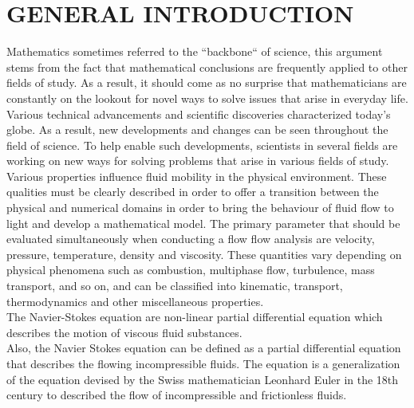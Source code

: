 \documentclass[11pt]{report}
\begin{document}
	\newpage
	\tableofcontents

	\newpage
	\chapter{GENERAL INTRODUCTION}
	Mathematics sometimes referred to the ``backbone`` of science, this argument stems from the fact that mathematical conclusions are frequently applied to other fields of study. As a result, it should come as no surprise that mathematicians are constantly on the lookout for novel ways to solve issues that arise in everyday life.\\
	
	Various technical advancements and scientific discoveries characterized today's globe. As a result, new developments and changes can be seen throughout the field of science. To help enable such developments, scientists in several fields are working on new ways for solving problems that arise in various fields of study.\\
	
	Various properties influence fluid mobility in the physical environment. These qualities must be clearly described in order to offer a transition between the physical and numerical domains in order to bring the behaviour of fluid flow to light and develop a mathematical model. The primary parameter that should be evaluated simultaneously when conducting a flow flow analysis are velocity, pressure, temperature, density and viscosity. These quantities vary depending on physical phenomena such as combustion, multiphase flow, turbulence, mass transport, and so on, and can be classified into kinematic, transport, thermodynamics and other miscellaneous properties.\\
	
	The Navier-Stokes equation are non-linear partial differential equation which describes the motion of viscous fluid substances.\\
	
	Also, the Navier Stokes equation can be defined as a partial differential equation that describes the flowing incompressible fluids. The equation is a generalization of the equation devised by the Swiss mathematician Leonhard Euler in the 18th century to described the flow of incompressible and frictionless fluids.\\
	
\end{document}
